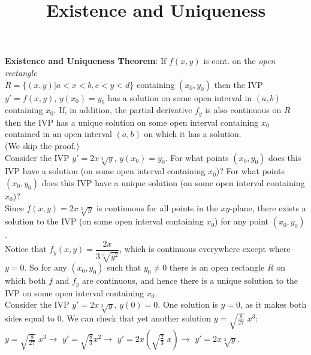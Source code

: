 \documentclass{ximera}
\begin{document}
\begin{abstract}
 \end{abstract}

    \title{Existence and Uniqueness}
    
    \maketitle

\textbf{Existence and Uniqueness Theorem}: If $f(x,y)$ is cont. on the \emph{open rectangle}\\ $R=\{(x,y)|a<x<b,c<y<d\}$ containing $(x_{0},y_{0})$ then the IVP $y'=f(x,y)$, $y(x_{0})=y_{0}$ has a solution on some open interval in $(a,b)$ containing $x_{0}$.  If, in addition, the partial derivative $f_{y}$ is also continuous on $R$ then the IVP has a unique solution on some open interval containing $x_0$ contained in an open interval $(a,b)$ on which it has a solution.\\

(We skip the proof.)\\


  Consider the IVP $y'=2x\sqrt[3]{y}$, $y(x_{0})=y_{0}$.  For what points $(x_{0},y_{0})$ does this IVP have a solution (on some open interval containing $x_{0}$)?  For what points $(x_{0},y_{0})$ does this IVP have a unique solution (on some open interval containing $x_{0}$)?\\

 Since $f(x,y)=2x\sqrt[3]{y}$ is continuous for all points in the $xy$-plane, there exists a solution to the IVP (on some open interval containing $x_{0}$) for any point $(x_{0},y_{0})$.\\


 Notice that $f_{y}(x,y)=\dfrac{2x}{3\sqrt[3]{y^{2}}}$,  which is continuous everywhere except where $y=0$.  So for any $(x_{0},y_{0})$ such that $y_{0}\neq 0$ there is an open rectangle $R$ on which both $f$ and $f_{y}$ are continuous,  and hence there is a unique solution to the IVP on some open interval containing $x_{0}$.\\


 Consider the IVP $y'=2x\sqrt[3]{y}$, $y(0)=0$.  One solution is $y=0$, as it makes both sides equal to $0$.  We can check that yet another solution $\displaystyle y=\sqrt{\frac{8}{27}}\;x^3$:\\

 $\displaystyle y=\sqrt{\frac{8}{27}} \; x^3 \rightarrow $  $\displaystyle y'=\sqrt{\frac{8}{3}} x^2\rightarrow $  $\displaystyle y'=2x\left(\sqrt{\frac{2}{3}}\;x\right)\rightarrow $  $\displaystyle y'=2x\sqrt[3]{y}$.\\
\end{document}
